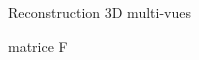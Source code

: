 \begin{frame}{Reconstruction 3D multi-vues}
\begin{minipage}{0.3\linewidth}
\begin{minipage}{0.4\linewidth}
    \end{minipage}
  \end{minipage}
\end{frame}

\begin{frame}{matrice F}
\end{frame}